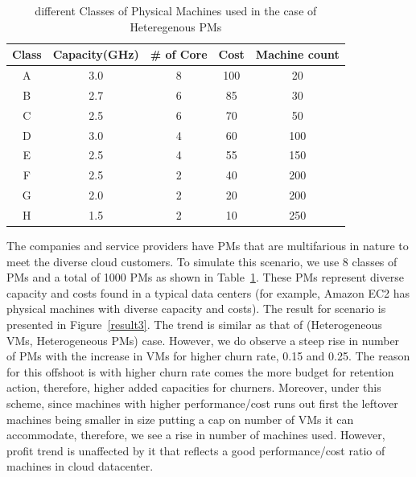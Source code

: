 \begin{table}[!htp]
\caption{different Classes of Physical Machines used in the case of Heteregenous PMs}
\label{table}
\centering
\begin{tabular}{c|c|c|c|c}
\hline
\hline
Class&Capacity(GHz)& \# of Core &Cost& Machine count\\
\hline
\hline
A&3.0&8&100&20\\
\hline
B&2.7&6&85&30\\
\hline
C&2.5&6&70&50\\
\hline
D&3.0&4&60&100\\
\hline
E&2.5&4&55&150\\
\hline
F&2.5&2&40&200\\
\hline
G&2.0&2&20&200\\
\hline
H&1.5&2&10&250\\
\hline
\end{tabular}
\end{table}
The companies and service providers have PMs that are multifarious in nature to meet the diverse cloud customers. To simulate this scenario,  we use 8 classes of PMs and a total of 1000 PMs as shown in Table~\ref{table}. These PMs represent diverse capacity and costs found in a typical data centers (for example, Amazon EC2 has physical machines with diverse capacity and costs). The result for scenario is presented in Figure~\ref{result3}. The trend is similar as that of (Heterogeneous VMs, Heterogeneous PMs) case. However, we do observe a steep rise in number of PMs with the increase in VMs for higher churn rate, 0.15 and 0.25. The reason for this offshoot is with higher churn rate comes the more budget for retention action, therefore, higher added capacities for churners. Moreover, under this scheme, since machines with higher performance/cost runs out first the leftover machines being smaller in size putting a cap on number of VMs it can accommodate, therefore, we see a rise in number of machines used. However, profit trend is unaffected by it that reflects a good performance/cost ratio of machines in cloud datacenter. 

   

%


 





